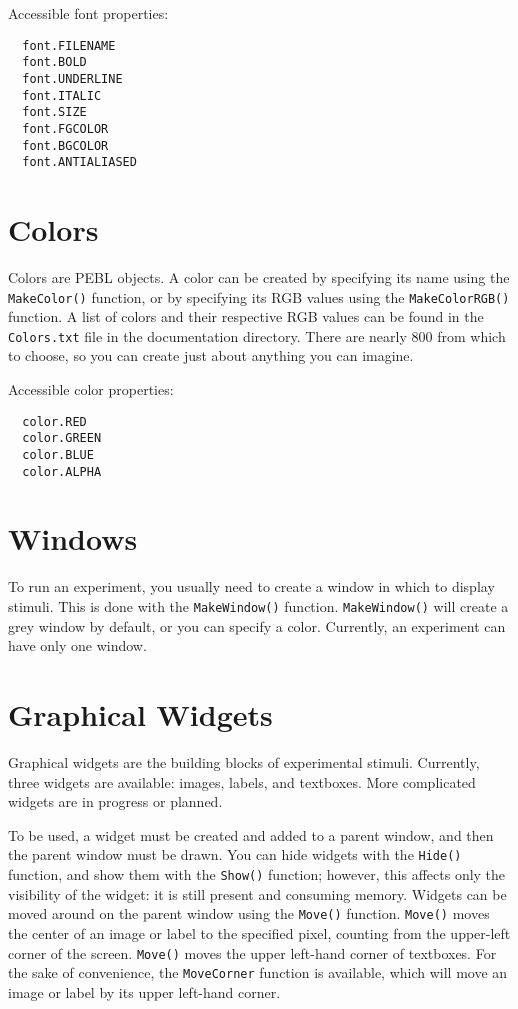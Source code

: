 Accessible font properties:
\begin{verbatim}
  font.FILENAME
  font.BOLD
  font.UNDERLINE
  font.ITALIC
  font.SIZE
  font.FGCOLOR
  font.BGCOLOR
  font.ANTIALIASED
\end{verbatim}
 


\section{Colors} 

Colors are PEBL objects.  A color can be created by specifying its name 
using the \texttt{MakeColor()} function, or by specifying its RGB values using the \texttt{MakeColorRGB()} function. A list of colors and their respective RGB values can be found in the \texttt{Colors.txt} file in the documentation directory. There are nearly 800 from which to choose, so you can create 
just about anything you can imagine.

Accessible color properties:
\begin{verbatim}
  color.RED
  color.GREEN
  color.BLUE
  color.ALPHA
\end{verbatim}
 

\section{Windows}

To run an experiment, you usually need to create a window in which 
to display stimuli.  This is done with the \texttt{MakeWindow()} function. \texttt{MakeWindow()} will create a grey window by default, or you can 
specify a color.  Currently, an experiment can have only one window.


\section{Graphical Widgets}

Graphical widgets are the building blocks of experimental stimuli. 
Currently, three widgets are available: images, labels, and textboxes.  
More complicated widgets are in progress or planned.

To be used, a widget must be created and added to a parent window, and
then the parent window must be drawn.  You can hide widgets with the
\texttt{Hide()} function, and show them with the \texttt{Show()}
function; however, this affects only the visibility of the widget: it
is still present and consuming memory. Widgets can be moved around on
the parent window using the \texttt{Move()} function. \texttt{Move()}
moves the center of an image or label to the specified pixel, counting
from the upper-left corner of the screen. \texttt{Move()} moves the
upper left-hand corner of textboxes.  For the sake of convenience, the
\texttt{MoveCorner} function is available, which will move an image or
label by its upper left-hand corner.

